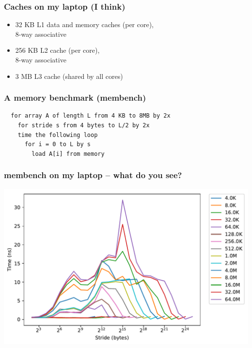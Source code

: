 \documentclass{beamer}
\begin{document}
\begin{frame}
  \frametitle{Caches on my laptop (I think)}

  \begin{itemize}
  \item 32 KB L1 data and memory caches (per core), \\
    8-way associative
  \item 256 KB L2 cache (per core), \\
    8-way associative
  \item 3 MB L3 cache (shared by all cores)
  \end{itemize}
\end{frame}


\begin{frame}[fragile]
  \frametitle{A memory benchmark (membench)}

\begin{verbatim}
  for array A of length L from 4 KB to 8MB by 2x
    for stride s from 4 bytes to L/2 by 2x
    time the following loop
      for i = 0 to L by s
        load A[i] from memory
\end{verbatim}

\end{frame}


\begin{frame}
  \frametitle{membench on my laptop -- what do you see?}

  \begin{center}
    \includegraphics[width=\textwidth]{figs/membench/timings_laptop-line.pdf}
  \end{center}
\end{frame}
\end{document}
